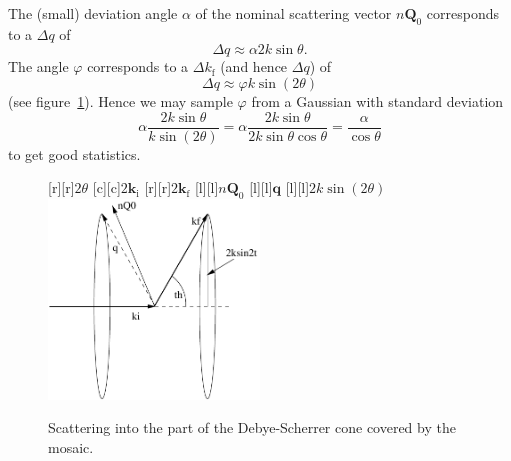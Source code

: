 The (small) deviation angle $\alpha$ of the nominal
scattering vector $n\textbf{Q}_0$ corresponds to a $\Delta q$ of
\begin{equation}
\Delta q \approx \alpha 2k\sin\theta.
\end{equation}
The angle $\varphi$ corresponds to a $\Delta k_\textrm{f}$ (and hence
$\Delta q$) of
\begin{equation}
\Delta q \approx \varphi k \sin(2\theta)
\end{equation}
(see figure~\ref{f:mosaic_cone}).
Hence we may sample $\varphi$ from a Gaussian with standard deviation
\begin{equation}
\alpha\frac{2k\sin\theta}{k\sin(2\theta)} =
\alpha\frac{2k\sin\theta}{2k\sin\theta\cos\theta} =
\frac{\alpha}{\cos\theta}
\end{equation}
to get good statistics.
%
\begin{figure}
  \begin{center}
    [r][r]{$2\theta$}
    [c][c]{$2\textbf{k}_\textrm{i}$}
    [r][r]{$2\textbf{k}_\textrm{f}$}
    [l][l]{$n\textbf{Q}_0$}
    [l][l]{$\textbf{q}$}
    [l][l]{$2 k \sin(2 \theta)$}
    \includegraphics[width=0.5\textwidth]{figures/mosaic_cone}
  \end{center}
\caption{Scattering into the part of the Debye-Scherrer cone covered by
    the mosaic.}
\label{f:mosaic_cone}
\end{figure}

